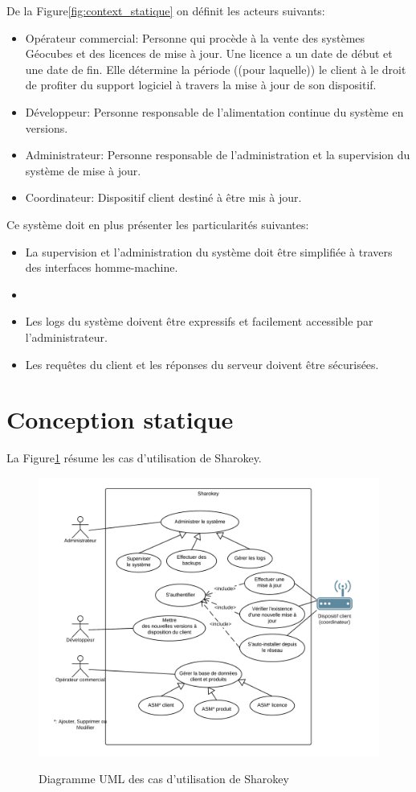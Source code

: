 \documentclass{themeensg}
\begin{document}
De la Figure\ref{fig:context_statique} on définit les acteurs suivants:
\begin{itemize}
\item Opérateur commercial: Personne qui procède à la vente des systèmes Géocubes et des licences de mise à jour. Une licence a un date de début et une date de fin. Elle détermine la période ((pour laquelle)) le client à le droit de profiter du support logiciel à travers la mise à jour de son dispositif.
\item Développeur: Personne responsable de l'alimentation continue du système en versions.
\item Administrateur: Personne responsable de l'administration et la supervision du système de mise à jour.
\item Coordinateur: Dispositif client destiné à être mis à jour.
\end{itemize}

Ce système doit en plus présenter les particularités suivantes:
\begin{itemize}
\item La supervision et l'administration du système doit être simplifiée à travers des interfaces homme-machine.
\item 
\item Les logs du système doivent être expressifs et facilement accessible par l'administrateur.
\item Les requêtes du client et les réponses du serveur doivent être sécurisées.

\end{itemize}

\section{Conception statique}
La Figure\ref{fig:use_case} résume les cas d'utilisation de Sharokey.

\begin{figure}[h!]
\centering
\includegraphics[scale=1]{images/use_case_sharokey.png}
\label{fig:use_case}
\caption{Diagramme UML des cas d'utilisation de Sharokey}
\end{figure}
\end{document}
